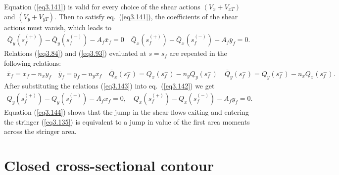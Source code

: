 \documentclass{AeroStructure-ERJohnson}
\begin{document}
\clearpage

\noindent Equation (\ref{eq3.141}) is valid for every choice of the shear actions $\left(V_{x}+V_{x T}\right)$ and $\left(V_{y}+V_{y T}\right)$. Then to satisfy eq.~(\ref{eq3.141}), the coefficients of the shear actions must vanish, which leads to
\begin{align}\label{eq3.142}
\bar{Q}_{y}\left(s_{f}^{(+)}\right)-\bar{Q}_{y}\left(s_{f}^{(-)}\right)-A_{f} \bar{x}_{f}=0 \quad \bar{Q}_{x}\left(s_{f}^{(+)}\right)-\bar{Q}_{x}\left(s_{f}^{(-)}\right)-A_{f} \bar{y}_{f}=0.
\end{align}
Relations (\ref{eq3.84}) and (\ref{eq3.93}) evaluated at $s=s_{f}$ are repeated in the following relations:
\begin{align}\label{eq3.143}
\bar{x}_{f}=x_{f}-n_{x} y_{f} \quad \bar{y}_{f}=y_{f} - n_{y} x_{f} \quad \bar{Q}_{x}\left(s_{f}^{-}\right)=Q_{x}\left(s_{f}^{-}\right)-n_{y} Q_{y}\left(s_{f}^{-}\right) \quad \bar{Q}_{y}\left(s_{f}^{-}\right)=Q_{y}\left(s_{f}^{-}\right)-n_{x} Q_{x}\left(s_{f}^{-}\right).
\end{align}
After substituting the relations (\ref{eq3.143}) into eq.~(\ref{eq3.142}) we get
\begin{align}\label{eq3.144}
Q_{y}\left(s_{f}^{(+)}\right)-Q_{y}\left(s_{f}^{(-)}\right)-A_{f} x_{f}=0, \quad Q_{x}\left(s_{f}^{(+)}\right)-Q_{x}\left(s_{f}^{(-)}\right)-A_{f} y_{f}=0.
\end{align}
Equation (\ref{eq3.144}) shows that the jump in the shear flows exiting and entering the stringer (\ref{eq3.135}) is equivalent to a jump in value of the first area moments across the stringer area.



\section{Closed cross-sectional contour}\label{sec3.11}
\end{document}
